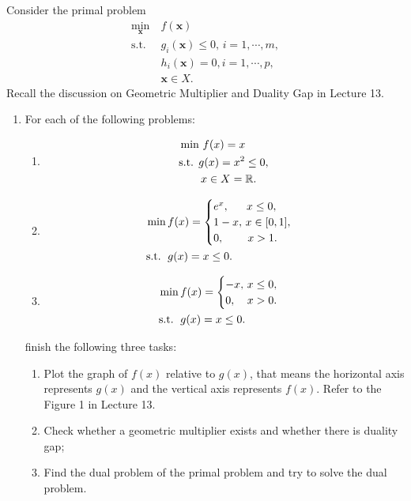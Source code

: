 \documentclass[11pt,letter,notitlepage]{article}
\begin{document}
\newpage
\begin{exercise}
Consider the primal problem
\begin{align}\label{prob:geometric}
    \min _{\mathbf{x}}\ &f(\mathbf{x}) \\ \nonumber
    \text{s.t.}\ &g_{i}(\mathbf{x}) \leq 0,\, i=1, \cdots, m, \\ \nonumber
    &h_{i}(\mathbf{x})=0, i=1, \cdots, p, \\ \nonumber
    &\mathbf{x} \in X.
\end{align}
Recall the discussion on Geometric Multiplier and Duality Gap in Lecture 13. 
\begin{enumerate}
    \item For each of the following problems:
    \begin{enumerate}
        \item \begin{align*}
		&\min\,f(x)=x\\
		&\mbox{s.t. }g(x)=x^2\leq0,\\
		&\hspace{7mm}x\in X=\mathbb{R}.
	\end{align*}
        \item \begin{align*}
		\min\,&f(x)=
		\begin{cases}
			e^x,\,\hspace{5mm}x\leq0,\\
			1-x,\,x\in[0,1],\\
			0,\,\hspace{7mm}x>1.
		\end{cases}\\
		\mbox{s.t. }\,&g(x)=x\leq0.
	\end{align*}
        \item\begin{align*}
		\min\,&f(x)=
		\begin{cases}
			-x,\,x\leq0,\\
			0,\,\hspace{3mm}x>0.
		\end{cases}\\
		\mbox{s.t. }\,&g(x)=x\leq0.
	\end{align*}
    \end{enumerate}
    finish the following three tasks:
    \begin{enumerate}
        \item Plot the graph of $f(x)$ relative to $g(x)$, that means the horizontal axis represents $g(x)$ and the vertical axis represents $f(x)$. Refer to the Figure 1 in Lecture 13.
        \item Check whether a geometric multiplier exists and whether there is duality gap;
        \item Find the dual problem of the primal problem and try to solve the dual problem.
    \end{enumerate}


\end{enumerate}
\end{exercise}
\end{document}
